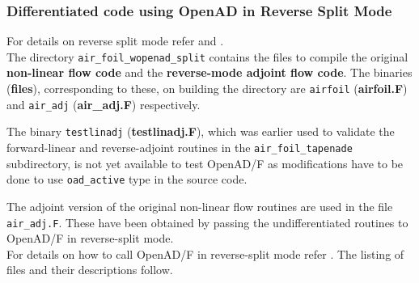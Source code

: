 \clearpage
\subsubsection{Differentiated code using OpenAD in Reverse Split Mode}
For details on reverse split mode refer \cite{Griewank_2008} and \cite{Utke_2014}.\\

\noindent The directory \texttt{air\_foil\_wopenad\_split} contains the files to compile the original \textbf{non-linear flow code} and the \textbf{reverse-mode adjoint flow code}. The binaries (\textbf{files}), corresponding to these, on building the directory are \texttt{airfoil} (\textbf{{airfoil.F}}) and \texttt{air\_adj} (\textbf{{air\_adj.F}}) respectively. \\

\begin{TodoPar}\noindent The binary \texttt{testlinadj} (\textbf{{testlinadj.F}}), which was earlier used to validate the forward-linear and reverse-adjoint routines in the \texttt{air\_foil\_tapenade} subdirectory, is not yet available to test OpenAD/F as modifications have to be done to use \texttt{oad\_active} type in the source code.\end{TodoPar}

\noindent The adjoint version of the original non-linear flow routines are used in the file  \texttt{air\_adj.F}. These have been obtained by passing the undifferentiated routines to OpenAD/F in reverse-split mode.\\

\noindent For details on how to call OpenAD/F in reverse-split mode refer \cite{Utke_2014}. The listing of files and their descriptions follow.\\



